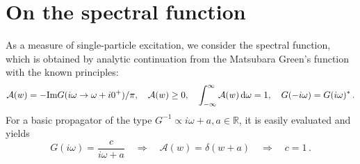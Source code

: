 \documentclass[11pt]{article}
\begin{document}
\section{On the spectral function}

As a measure of single-particle excitation, we consider the spectral function, which is obtained by analytic continuation from the Matsubara Green's function with the known principles:
%
\begin{equation}
\mathcal{A}(w) = - \text{Im} G(i\omega \rightarrow \omega + i0^+) / \pi,
\quad
\mathcal{A}(w) \geq 0,
\quad
\int_{-\infty}^{\infty} \mathcal{A}(w) \dif \omega = 1,
\quad
G(-i\omega) = G(i\omega)^*
\, .
\end{equation}
%
For a basic propagator of the type $G^{-1} \propto i\omega + a, a \in \mathbb{R}$, it is easily evaluated and yields
%
 \begin{equation}
 G(i\omega) = \frac{c}{i\omega+a} 
 \quad
 \Rightarrow
 \quad
\mathcal{A}(w) = \delta(w+a)
\quad
\Rightarrow
\quad
c = 1 
\, .
 \end{equation}















\end{document}
